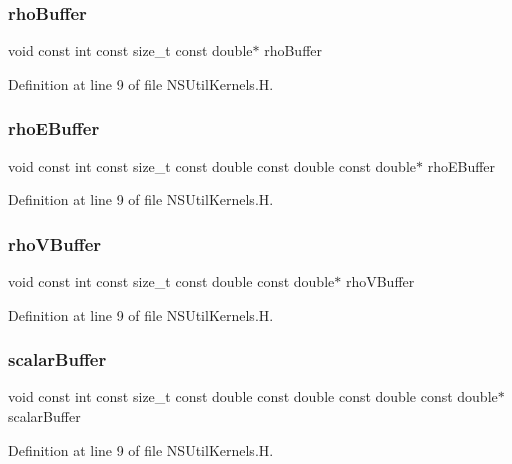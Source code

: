 \subsubsection{\texorpdfstring{rho\+Buffer}{rhoBuffer}}
{\footnotesize\ttfamily void const int const size\+\_\+t const double$\ast$ rho\+Buffer}



Definition at line 9 of file N\+S\+Util\+Kernels.\+H.

\hypertarget{NSUtilKernels_8H_ac8e38c823aaa65559cdca01483e47101}{}\label{NSUtilKernels_8H_ac8e38c823aaa65559cdca01483e47101} 
\subsubsection{\texorpdfstring{rho\+E\+Buffer}{rhoEBuffer}}
{\footnotesize\ttfamily void const int const size\+\_\+t const double const double const double$\ast$ rho\+E\+Buffer}



Definition at line 9 of file N\+S\+Util\+Kernels.\+H.

\hypertarget{NSUtilKernels_8H_a49109d7a1f9578103da42a76abf90454}{}\label{NSUtilKernels_8H_a49109d7a1f9578103da42a76abf90454} 
\subsubsection{\texorpdfstring{rho\+V\+Buffer}{rhoVBuffer}}
{\footnotesize\ttfamily void const int const size\+\_\+t const double const double$\ast$ rho\+V\+Buffer}



Definition at line 9 of file N\+S\+Util\+Kernels.\+H.

\hypertarget{NSUtilKernels_8H_a065fa9e9e325101c378447214d37d8b1}{}\label{NSUtilKernels_8H_a065fa9e9e325101c378447214d37d8b1} 
\subsubsection{\texorpdfstring{scalar\+Buffer}{scalarBuffer}}
{\footnotesize\ttfamily void const int const size\+\_\+t const double const double const double const double$\ast$ scalar\+Buffer}



Definition at line 9 of file N\+S\+Util\+Kernels.\+H.

